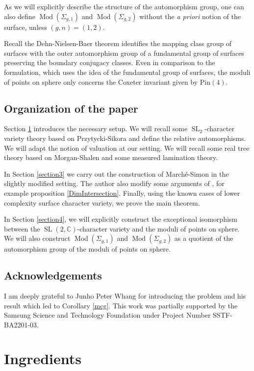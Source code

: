 \documentclass[11pt]{amsart}
\numberwithin{theorem}{section}
\theoremstyle{definition}
\theoremstyle{remark}
\newcommand{\C}{{\mathbb{C}}}
\DeclareMathOperator{\Mod}{Mod}
\DeclareMathOperator{\SL}{SL}
\newcommand{\<}{\langle}
\renewcommand{\>}{\rangle}
\begin{document}
As we will explicitly describe the structure of the automorphism group, one can also define $\Mod(\Sigma_{g,1})$ and $\Mod(\Sigma_{g,2})$ without the \textit{a priori} notion of the surface, unless $(g, n) = (1, 2)$.

Recall the Dehn-Nielsen-Baer theorem identifies the mapping class group of surfaces with the outer automorphism group of a fundamental group of surfaces preserving the boundary conjugacy classes. Even in comparison to the formulation, which uses the idea of the fundamental group of surfaces, the moduli of points on sphere only concerns the Coxeter invariant given by $\mathrm{Pin}(4)$.

\subsection*{Organization of the paper}
Section \ref{section2} introduces the necessary setup. We will recall some $\SL_2$-character variety theory based on Przytycki-Sikora \cite{przytycki1997skein, przytycki2019skein} and define the relative automorphisms. We will adapt the notion of valuation at our setting. We will recall some real tree theory based on Morgan-Shalen \cite{morgan1984valuations} and some measured lamination theory.

In Section \ref{section3} we carry out the construction of March\'e-Simon \cite{marche2021automorphisms} in the slightly modified setting. The author also modify some arguments of \cite{marche2021automorphisms}, for example proposition \ref{DimIntersection}. Finally, using the known cases of lower complexity surface character variety, we prove the main theorem.

In Section \ref{section4}, we will explicitly construct the exceptional isomorphism between the $\SL(2, \C)$-character variety and the moduli of points on sphere. We will also construct $\Mod(\Sigma_{g,1})$ and $\Mod(\Sigma_{g,2})$ as a quotient of the automorphism group of the moduli of points on sphere.

\subsection*{Acknowledgements}
I am deeply grateful to Junho Peter Whang for introducing the problem and his result which led to Corollary \ref{mcg}. This work was partially supported by the Samsung Science and Technology Foundation under Project Number SSTF-BA2201-03.

\section{Ingredients}\label{section2}
\end{document}
